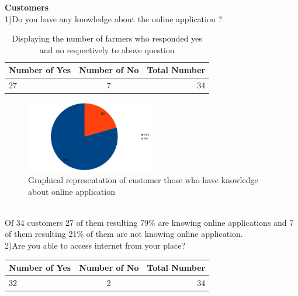 \documentclass[12pt]{report}
\begin{document}
\begin{normalsize}
{\bfseries Customers }\newline\\[0.1cm]
1)Do you have any knowledge about the online application ?\newline\\[0.1cm]
\begin{table}[h]       %
		\centering
		\begin{tabular}{ | l | c | r | } \hline
		\textbf{Number of Yes} & \textbf{Number of No} & \textbf{Total Number} \\ \hline			
		27 & 7 & 34 \\ \hline
		\end{tabular}
		\caption{Displaying the number of farmers who responded yes and no respectively to above question}
		\label{5.0}
	    \end{table}
\begin{figure}[h]       %
	\centering
	\includegraphics[width=0.5\textwidth]{customer 1.png}
	\caption{ Graphical representation of customer those who have knowledge about online application  }
	\label{myLabel}		%
	\end{figure}
\newline\\[0.1cm]
Of 34 customers 27 of them resulting 79\% are knowing online applications and 7 of them resulting 21\% of them are not knowing online application.\newline\\[0.1cm]
2)Are you able to access internet from your place?\newline\\[0.1cm]
\begin{table}[h]       %
		\centering
		\begin{tabular}{ | l | c | r | } \hline
		\textbf{Number of Yes} & \textbf{Number of No} & \textbf{Total Number} \\ \hline			
		32 & 2 & 34 \\ \hline

\end{tabular}
\end{table}
\end{normalsize}
\end{document}
